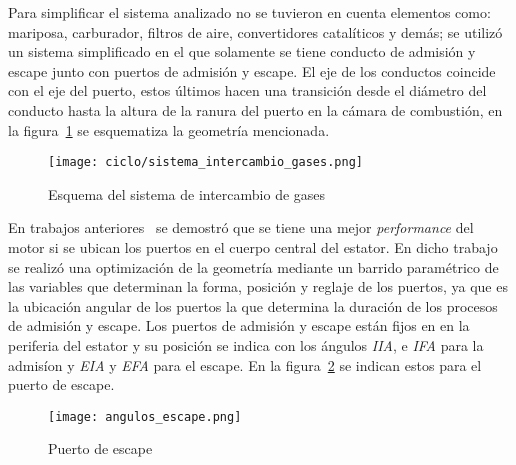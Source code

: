 Para simplificar el sistema analizado no se tuvieron en cuenta elementos como:
mariposa, carburador, filtros de aire, convertidores catalíticos y demás; se
utilizó un sistema simplificado en el que solamente se tiene conducto de
admisión y escape junto con puertos de admisión y escape.
%
El eje de los conductos coincide con el eje del puerto, estos últimos hacen una
transición desde el diámetro del conducto hasta la altura de la ranura del
puerto en la cámara de combustión, en la
figura~\ref{fig:sistema_intercambio_gases} se esquematiza la geometría
mencionada.

\begin{figure}
    \centering
    \texttt{[image: ciclo/sistema\_intercambio\_gases.png]}
    \caption{Esquema del sistema de intercambio de gases}\label{fig:sistema_intercambio_gases}
\end{figure}


En trabajos anteriores~\parencite{lopez13} se demostró que se tiene una mejor
\emph{performance} del motor si se ubican los puertos en el cuerpo central del
estator.
%
En dicho trabajo se realizó una optimización de la geometría mediante un barrido
paramétrico de las variables que determinan la forma, posición y reglaje de los
puertos, ya que es la ubicación angular de los puertos la que determina la
duración de los procesos de admisión y escape.
%
%
Los puertos de admisión y escape están fijos en en la periferia del estator y su
posición se indica con los ángulos \emph{IIA}, e \emph{IFA} para la admisíon y
\emph{EIA} y \emph{EFA} para el escape.
%
En la figura~\ref{fig:angulos_escape} se indican estos para el puerto de escape.

\begin{figure}
    \centering
    \texttt{[image: angulos\_escape.png]}
    \caption{Puerto de escape}\label{fig:angulos_escape}
\end{figure}

